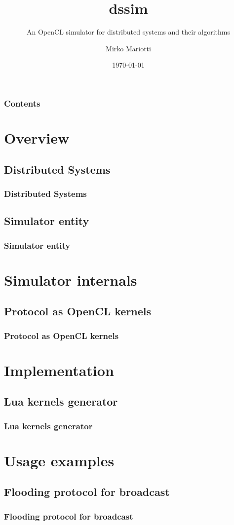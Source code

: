 \documentclass{beamer}
\begin{document}
\title[\today]{dssim}
\subtitle{An OpenCL simulator for distributed systems and their algorithms}  
\author{Mirko Mariotti}
\date{\today}


\begin{frame}[plain]\titlepage
\end{frame}

\begin{frame}\frametitle{Contents}
\tableofcontents
\end{frame} 


\section{Overview}

\subsection{Distributed Systems}

\begin{frame}\frametitle{Distributed Systems}
\end{frame}

\subsection{Simulator entity}

\begin{frame}\frametitle{Simulator entity}
\end{frame}

\section{Simulator internals}

\subsection{Protocol as OpenCL kernels}

\begin{frame}\frametitle{Protocol as OpenCL kernels}
\end{frame}


\section{Implementation}

\subsection{Lua kernels generator}

\begin{frame}\frametitle{Lua kernels generator}
\end{frame}


\section{Usage examples}

\subsection{Flooding protocol for broadcast}

\begin{frame}\frametitle{Flooding protocol for broadcast}
\end{frame}
\end{document}
